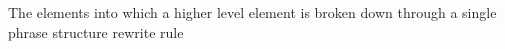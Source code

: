 The elements into which a higher level element is broken down through a single phrase structure rewrite rule
